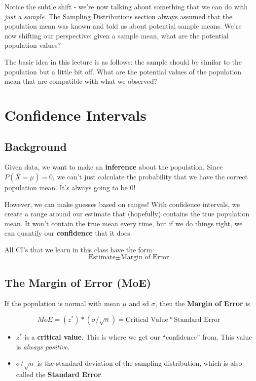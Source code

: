 \documentclass[
  letterpaper,
  DIV=11,
  numbers=noendperiod]{scrreprt}
\providecommand{\tightlist}{%
  \setlength{\itemsep}{0pt}\setlength{\parskip}{0pt}}\usepackage{longtable,booktabs,array}
\begin{document}
Notice the subtle shift - we're now talking about something that we can
do with \emph{just a sample}. The Sampling Distributions section always
assumed that the population mean was known and told us about potential
sample means. We're now shifting our perspective: given a sample mean,
what are the potential population values?

The basic idea in this lecture is as follows: the sample should be
similar to the population but a little bit off. What are the potential
values of the population mean that are compatible with what we observed?

\hypertarget{confidence-intervals}{%
\section{Confidence Intervals}\label{confidence-intervals}}

\hypertarget{background}{%
\subsection{Background}\label{background}}

Given data, we want to make an \textbf{inference} about the population.
Since \(P(\bar X = \mu) = 0\), we can't just calculate the probability
that we have the correct population mean. It's always going to be 0!

However, we can make guesses based on ranges! With confidence intervals,
we create a range around our estimate that (hopefully) contains the true
population mean. It won't contain the true mean every time, but if we do
things right, we can quantify our \textbf{confidence} that it does.

All CI's that we learn in this class have the form: \[
\text{Estimate} \pm \text{Margin of Error}
\]

\hypertarget{the-margin-of-error-moe}{%
\subsection{The Margin of Error (MoE)}\label{the-margin-of-error-moe}}

If the population is normal with mean \(\mu\) and sd \(\sigma\), then
the \textbf{Margin of Error} is

\[
MoE = (z^*)*(\sigma/\sqrt{n}) = \text{Critical Value}*\text{Standard Error}
\]

\begin{itemize}
\tightlist
\item
  \(z^*\) is a \textbf{critical value}. This is where we get our
  ``confidence'' from. This value is \emph{always positive}.
\item
  \(\sigma/\sqrt{n}\) is the standard deviation of the sampling
  distribution, which is also called the \textbf{Standard Error}.
\end{itemize}
\end{document}
